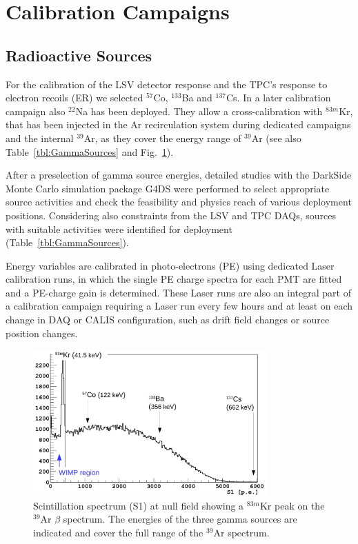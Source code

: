 \section{Calibration Campaigns}\label{sec:CalibCampaigns}
\subsection{Radioactive Sources}
For the calibration of the LSV detector response and the TPC's response to electron recoils (ER) we selected $^{57}$Co, $^{133}$Ba and $^{137}$Cs. In a later calibration campaign also $^{22}$Na has been deployed. They allow a cross-calibration with $^{83m}$Kr, that has been injected in the Ar recirculation system during dedicated campaigns and the internal $^{39}$Ar, as they cover the energy range of $^{39}$Ar (see also Table~\ref{tbl:GammaSources} and Fig.~\ref{fig:GammaSources_Ar39spectrum}). %

After a preselection of gamma source energies, detailed studies with the DarkSide Monte Carlo simulation package G4DS \cite{DS50:G4DS:paper} were performed to select appropriate source activities and check the feasibility and physics reach of various deployment positions. Considering also constraints from the LSV and TPC DAQs, sources with suitable activities were identified for deployment (Table~\ref{tbl:GammaSources}).

Energy variables are calibrated in photo-electrons (PE) using dedicated Laser calibration runs, in which the single PE charge spectra for each PMT are fitted and a PE-charge gain is determined. 
These Laser runs are also an integral part of a calibration campaign requiring a Laser run every few hours and at least on each change in DAQ or CALIS configuration, such as drift field changes or source position changes.

\begin{figure}[htbp]
 \centering
 \includegraphics[width=0.8\textwidth]{Figures/GammaSources_Ar39spectrum.png}
 \caption{Scintillation spectrum (S1) at null field showing a $^{83m}$Kr peak on the $^{39}$Ar $\beta$ spectrum. The energies of the three gamma sources are indicated and cover the full range of the $^{39}$Ar spectrum.
\label{fig:GammaSources_Ar39spectrum}}
\end{figure}

